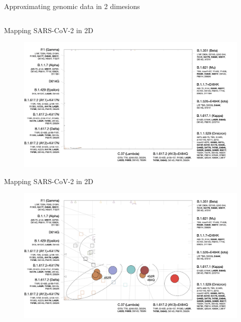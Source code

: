 \documentclass{beamer}
\begin{document}
\begin{frame}{Approximating genomic data in 2 dimesions }
\begin{columns}
    \end{columns}
    \centering
    \vfill
    \tiny{\cite{lapedesGeometryShapeSpace2001,smithMappingAntigenicGenetic2004}}
\end{frame}


\begin{frame}{Mapping SARS-CoV-2 in 2D}
        \begin{figure}
        \includegraphics[width=\textwidth]{sars_cov_2_map/wilks_1.png}
    \end{figure}   
    \centering
    \vfill
    \tiny{\cite{wilksMappingSARSCoV2Antigenic2022}}
\end{frame}



\begin{frame}{Mapping SARS-CoV-2 in 2D}
    \begin{figure}
    \includegraphics[width=\textwidth]{sars_cov_2_map/wilks_2.png}
\end{figure}   
\centering
\vfill
\tiny{\cite{wilksMappingSARSCoV2Antigenic2022}}
\end{frame}
\end{document}
